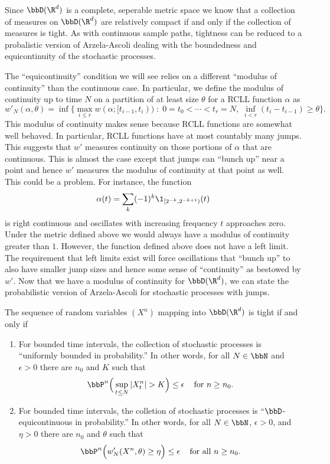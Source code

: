 \documentclass{report}
\begin{document}
Since $\bbD(\R^d)$ is a complete, seperable metric space we know that
a collection of measures on $\bbD(\R^d)$ are relatively compact if and
only if the collection of measures is tight.  As with continuous
sample paths, tightness can be reduced to a probalistic version of
Arzela-Ascoli dealing with the boundedness and equicontinuity of the
stochastic processes.  

The ``equicontinuity'' condition we will see relies on a different
``modulus of continuity'' than the continuous case.  In particular, we
define the modulus of continuity up to time $N$ on a partition of at
least size $\theta$ for a RCLL function $\alpha$ as
\[
w'_N(\alpha,\theta) = \inf \Big\{ \max_{i \leq r} w(\alpha; [t_{i-1},
t_i)) \; : \; 0 = t_0 < \cdots < t_r = N, \; \inf_{i<r} (t_i -
t_{i-1}) \geq \theta \Big\}.
\]
This modulus of continuity makes sense because RCLL functions are
somewhat well behaved.  In particular, RCLL functions have at most
countably many jumps.  This suggests that $w'$ measures continuity on
those portions of $\alpha$ that are continuous.  This is almost the
case except that jumps can ``bunch up'' near a point and hence $w'$
measures the modulus of continuity at that point as well.  This could
be a problem.  For instance, the function
\[
\alpha(t) = \sum_k (-1)^k \1_{[2^{-k},2^{-k+1})}(t)
\]
is right continuous and oscillates with increasing frequency $t$
approaches zero.  Under the metric defined above we would always have
a modulus of continuity greater than $1$.  However, the function
defined above does not have a left limit.  The requirement that left
limits exist will force oscillations that ``bunch up'' to also have
smaller jump sizes and hence some sense of ``continuity'' as bestowed
by $w'$.   Now that we have a modulus of continuity for $\bbD(\R^d)$,
we can state the probabilistic version of Arzela-Ascoli for stochastic
processes with jumps.

\begin{theorem}
The sequence of random variables $(X^n)$ mapping into $\bbD(\R^d)$ is
tight if and only if
\begin{enumerate}
\item For bounded time intervals, the collection of stochastic
processes is ``uniformly bounded in probability.''  In other words,
for all $N \in \bbN$ and $\epsilon > 0$ there are $n_0$ and $K$ such
that
\[
\bbP^n \Big(\sup_{t \leq N} |X_t^n| > K \Big) \leq \epsilon \;\;\;
\textmd{ for } n \geq n_0.
\]
\item For bounded time intervals, the colletion of stochastic
processes is ``$\bbD$-equicontinuous in probability.'' In other words,
for all $N \in \bbN$, $\epsilon > 0$, and $\eta > 0$ there are $n_0$
and $\theta$ such that
\[
\bbP^n \Big( w'_N(X^n,\theta) \geq \eta \Big) \leq \epsilon \;\;\;
\textmd{ for all } n \geq n_0.
\]
\end{enumerate}
\end{theorem}
\end{document}
